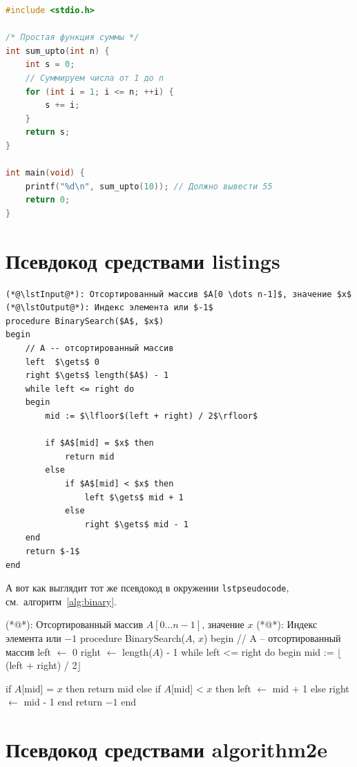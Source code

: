\documentclass{cmcmsuthesis-phd}
\begin{document}
\begin{lstlisting}[language=C,caption={Тест C-кода с русскими комментариями}]
#include <stdio.h>

/* Простая функция суммы */
int sum_upto(int n) {
    int s = 0;
    // Суммируем числа от 1 до n
    for (int i = 1; i <= n; ++i) {
        s += i;
    }
    return s;
}

int main(void) {
    printf("%d\n", sum_upto(10)); // Должно вывести 55
    return 0;
}
\end{lstlisting}
\section{Псевдокод средствами listings}
\label{sec:org7a06d15}

\begin{lstlisting}[style=pseudocode,caption={Псевдокод через listings}]
(*@\lstInput@*): Отсортированный массив $A[0 \dots n-1]$, значение $x$
(*@\lstOutput@*): Индекс элемента или $-1$
procedure BinarySearch($A$, $x$)
begin
    // A -- отсортированный массив
    left  $\gets$ 0
    right $\gets$ length($A$) - 1
    while left <= right do
    begin
        mid := $\lfloor$(left + right) / 2$\rfloor$

        if $A$[mid] = $x$ then
            return mid
        else
            if $A$[mid] < $x$ then
                left $\gets$ mid + 1
            else
                right $\gets$ mid - 1
    end
    return $-1$
end
\end{lstlisting}

А вот как выглядит тот же псевдокод в окружении \texttt{lstpseudocode}, см.~алгоритм~\ref{alg:binary}.

\begin{lstpseudocode}[caption={Псевдокод через LSTpseudocode}, label={alg:binary}]
(*@\lstInput@*): Отсортированный массив $A[0 \dots n-1]$, значение $x$
(*@\lstOutput@*): Индекс элемента или $-1$
procedure BinarySearch($A$, $x$)
begin
    // A -- отсортированный массив
    left  $\gets$ 0
    right $\gets$ length($A$) - 1
    while left <= right do
    begin
        mid := $\lfloor$(left + right) / 2$\rfloor$

        if $A$[mid] = $x$ then
            return mid
        else
            if $A$[mid] < $x$ then
                left $\gets$ mid + 1
            else
                right $\gets$ mid - 1
    end
    return $-1$
end
\end{lstpseudocode}
\section{Псевдокод средствами algorithm2e}
\label{sec:org58cc529}
\end{document}
